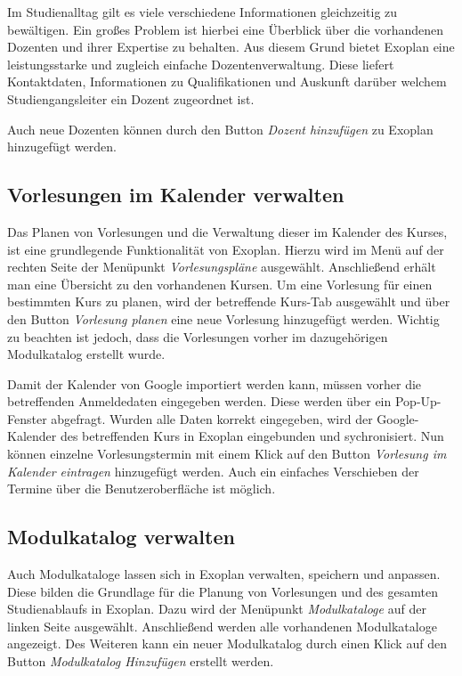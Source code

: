 Im Studienalltag gilt es viele verschiedene Informationen gleichzeitig zu bewältigen. Ein großes Problem ist hierbei eine Überblick über die vorhandenen Dozenten und ihrer Expertise zu behalten. Aus diesem Grund bietet Exoplan eine leistungsstarke und zugleich einfache Dozentenverwaltung. Diese liefert Kontaktdaten, Informationen zu Qualifikationen und Auskunft darüber welchem Studiengangsleiter ein Dozent zugeordnet ist.

Auch neue Dozenten können durch den Button \textit{Dozent hinzufügen} zu Exoplan hinzugefügt werden.
\subsection{Vorlesungen im Kalender verwalten}

Das Planen von Vorlesungen und die Verwaltung dieser im Kalender des Kurses, ist eine grundlegende Funktionalität von Exoplan. Hierzu wird im Menü auf der rechten Seite der Menüpunkt \textit{Vorlesungspläne} ausgewählt. Anschließend erhält man eine Übersicht zu den vorhandenen Kursen. Um eine Vorlesung für einen bestimmten Kurs zu planen, wird der betreffende Kurs-Tab ausgewählt und über den Button \textit{Vorlesung planen} eine neue Vorlesung hinzugefügt werden. Wichtig zu beachten ist jedoch, dass die Vorlesungen vorher im dazugehörigen Modulkatalog erstellt wurde.

Damit der Kalender von Google importiert werden kann, müssen vorher die betreffenden Anmeldedaten eingegeben werden. Diese werden über ein Pop-Up-Fenster abgefragt. Wurden alle Daten korrekt eingegeben, wird der Google-Kalender des betreffenden Kurs in Exoplan eingebunden und sychronisiert. Nun können einzelne Vorlesungstermin mit einem Klick auf den Button \textit{Vorlesung im Kalender eintragen} hinzugefügt werden. Auch ein einfaches Verschieben der Termine über die Benutzeroberfläche ist möglich.

\subsection{Modulkatalog verwalten}

Auch Modulkataloge lassen sich in Exoplan verwalten, speichern und anpassen. Diese bilden die Grundlage für die Planung von Vorlesungen und des gesamten Studienablaufs in Exoplan. Dazu wird der Menüpunkt \textit{Modulkataloge} auf der linken Seite ausgewählt. Anschließend werden alle vorhandenen Modulkataloge angezeigt. Des Weiteren kann ein neuer Modulkatalog durch einen Klick auf den Button \textit{Modulkatalog Hinzufügen} erstellt werden. 

